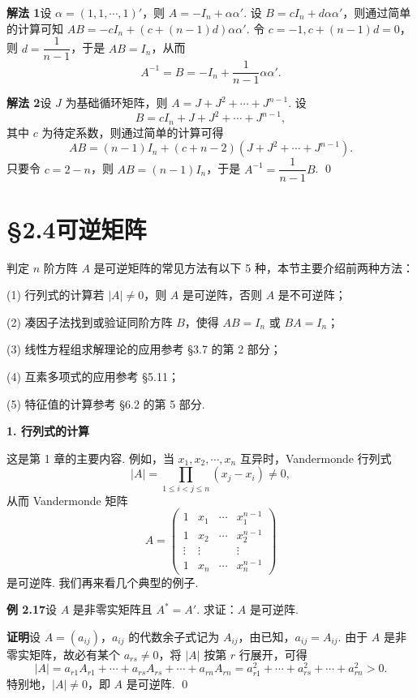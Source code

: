 \documentclass[UTF8,12pt,a4paper,fontset=fandol]{ctexart}
\begin{document}
\noindent\textbf{解法 1}\quad 设 $\alpha=(1,1,\cdots,1)'$，则 $A=-I_n+\alpha\alpha'$. 设 $B=cI_n+d\alpha\alpha'$，则通过简单的计算可知 $AB=-cI_n+(c+(n-1)d)\alpha\alpha'$. 令 $c=-1,c+(n-1)d=0$，则 $d=\dfrac1{n-1}$，于是 $AB=I_n$，从而
\[
A^{-1}=B=-I_n+\frac1{n-1}\alpha\alpha'.
\]

\noindent\textbf{解法 2}\quad 设 $J$ 为基础循环矩阵，则 $A=J+J^2+\cdots+J^{n-1}$. 设
\[
B=cI_n+J+J^2+\cdots+J^{n-1},
\]
其中 $c$ 为待定系数，则通过简单的计算可得
\[
AB=(n-1)I_n+(c+n-2)(J+J^2+\cdots+J^{n-1}).
\]
只要令 $c=2-n$，则 $AB=(n-1)I_n$，于是 $A^{-1}=\dfrac1{n-1}B$. \qed

\section*{§2.4\quad 可逆矩阵}

判定 $n$ 阶方阵 $A$ 是可逆矩阵的常见方法有以下 5 种，本节主要介绍前两种方法：

(1) 行列式的计算\quad 若 $|A|\ne0$，则 $A$ 是可逆阵，否则 $A$ 是不可逆阵；

(2) 凑因子法\quad 找到或验证同阶方阵 $B$，使得 $AB=I_n$ 或 $BA=I_n$；

(3) 线性方程组求解理论的应用\quad 参考 §3.7 的第 2 部分；

(4) 互素多项式的应用\quad 参考 §5.11；

(5) 特征值的计算\quad 参考 §6.2 的第 5 部分.

\noindent\textbf{1. 行列式的计算}

这是第 1 章的主要内容. 例如，当 $x_1,x_2,\cdots,x_n$ 互异时，Vandermonde 行列式
\[
|A|=\prod_{1\le i<j\le n}(x_j-x_i)\ne0,
\]
从而 Vandermonde 矩阵
\[
A=
\left(
\begin{array}{cccc}
1 & x_1 & \cdots & x_1^{n-1}\\
1 & x_2 & \cdots & x_2^{n-1}\\
\vdots & \vdots & & \vdots\\
1 & x_n & \cdots & x_n^{n-1}
\end{array}
\right)
\]
是可逆阵. 我们再来看几个典型的例子.

\noindent\textbf{例 2.17}\quad 设 $A$ 是非零实矩阵且 $A^*=A'$. 求证：$A$ 是可逆阵.

\noindent\textbf{证明}\quad 设 $A=(a_{ij})$，$a_{ij}$ 的代数余子式记为 $A_{ij}$，由已知，$a_{ij}=A_{ij}$. 由于 $A$ 是非零实矩阵，故必有某个 $a_{rs}\ne0$，将 $|A|$ 按第 $r$ 行展开，可得
\[
|A|=a_{r1}A_{r1}+\cdots+a_{rs}A_{rs}+\cdots+a_{rn}A_{rn}
=a_{r1}^2+\cdots+a_{rs}^2+\cdots+a_{rn}^2>0.
\]
特别地，$|A|\ne0$，即 $A$ 是可逆阵. \qed
\end{document}
